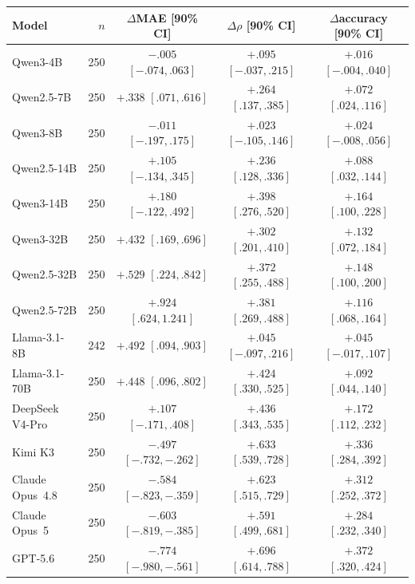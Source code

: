 \begin{center}
\begin{minipage}{\linewidth}
\centering
{}
\label{tab:coin-city-symbol-context}
\scriptsize
\setlength{\tabcolsep}{3pt}
\begin{tabular}{l r c c c}
\toprule
Model & \(n\) & \(\Delta\)MAE [90\% CI] & \(\Delta\rho\) [90\% CI] & \(\Delta\)accuracy [90\% CI] \\
\midrule
Qwen3-4B & 250 & $-.005$ $[-.074,.063]$ & $+.095$ $[-.037,.215]$ & $+.016$ $[-.004,.040]$ \\
Qwen2.5-7B & 250 & $+.338$ $[.071,.616]$ & $+.264$ $[.137,.385]$ & $+.072$ $[.024,.116]$ \\
Qwen3-8B & 250 & $-.011$ $[-.197,.175]$ & $+.023$ $[-.105,.146]$ & $+.024$ $[-.008,.056]$ \\
Qwen2.5-14B & 250 & $+.105$ $[-.134,.345]$ & $+.236$ $[.128,.336]$ & $+.088$ $[.032,.144]$ \\
Qwen3-14B & 250 & $+.180$ $[-.122,.492]$ & $+.398$ $[.276,.520]$ & $+.164$ $[.100,.228]$ \\
Qwen3-32B & 250 & $+.432$ $[.169,.696]$ & $+.302$ $[.201,.410]$ & $+.132$ $[.072,.184]$ \\
Qwen2.5-32B & 250 & $+.529$ $[.224,.842]$ & $+.372$ $[.255,.488]$ & $+.148$ $[.100,.200]$ \\
Qwen2.5-72B & 250 & $+.924$ $[.624,1.241]$ & $+.381$ $[.269,.488]$ & $+.116$ $[.068,.164]$ \\
\midrule
Llama-3.1-8B & 242 & $+.492$ $[.094,.903]$ & $+.045$ $[-.097,.216]$ & $+.045$ $[-.017,.107]$ \\
Llama-3.1-70B & 250 & $+.448$ $[.096,.802]$ & $+.424$ $[.330,.525]$ & $+.092$ $[.044,.140]$ \\
DeepSeek V4-Pro & 250 & $+.107$ $[-.171,.408]$ & $+.436$ $[.343,.535]$ & $+.172$ $[.112,.232]$ \\
Kimi K3 & 250 & $-.497$ $[-.732,-.262]$ & $+.633$ $[.539,.728]$ & $+.336$ $[.284,.392]$ \\
Claude Opus~4.8 & 250 & $-.584$ $[-.823,-.359]$ & $+.623$ $[.515,.729]$ & $+.312$ $[.252,.372]$ \\
Claude Opus~5 & 250 & $-.603$ $[-.819,-.385]$ & $+.591$ $[.499,.681]$ & $+.284$ $[.232,.340]$ \\
GPT-5.6 & 250 & $-.774$ $[-.980,-.561]$ & $+.696$ $[.614,.788]$ & $+.372$ $[.320,.424]$ \\
\bottomrule
\end{tabular}
\end{minipage}
\end{center}

